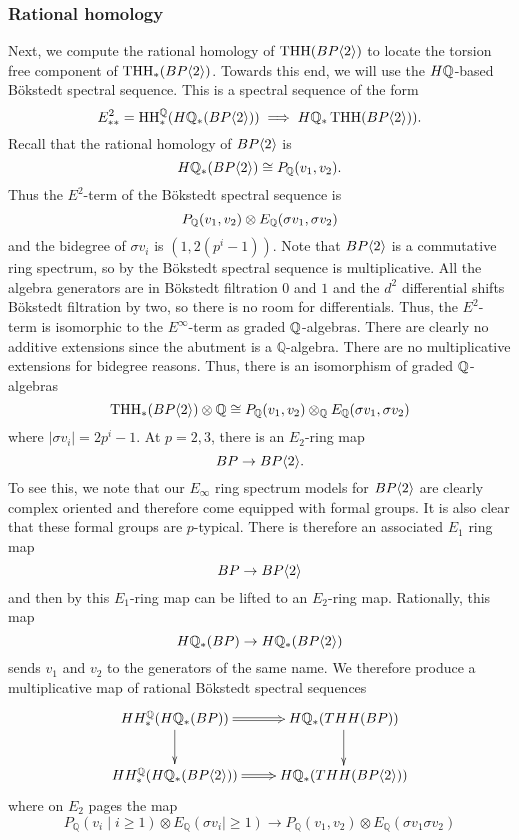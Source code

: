 \subsubsection{Rational homology}

Next, we compute the rational homology of $\operatorname{THH}(BP\langle 2 \rangle)$ to locate the torsion free component of $\operatorname{THH}_*(BP\langle 2 \rangle)$. Towards this end, we will use the $H\mathbb{Q}$-based B\"okstedt spectral sequence. This is a spectral sequence of the form 
\[
E^2_{**}=\operatorname{HH}_*^{\mathbb{Q}}(H\mathbb{Q}_*(BP\langle 2 \rangle))\implies H\mathbb{Q}_*\operatorname{THH}(BP\langle 2 \rangle)).
\]
Recall that the rational homology of $BP\langle 2 \rangle$ is  
\[
H\mathbb{Q}_*(BP\langle 2 \rangle)\cong P_{\mathbb{Q}} (v_1,v_2).
\]
Thus the $E^2$-term of the B\"okstedt spectral sequence is 
\[
P_{\mathbb{Q}}(v_1, v_2)\otimes E_{\mathbb{Q}}( \sigma v_1,\sigma v_2)
\]
and the bidegree of $\sigma v_i$ is $(1,2(p^i-1))$. Note that $BP\langle 2 \rangle$ is a commutative ring spectrum, so by \cite[Prop. 4.3]{AngeltveitRognes} the B\"okstedt spectral sequence is multiplicative. All the algebra generators are in B\"okstedt filtration $0$ and $1$ and the $d^2$ differential shifts B\"okstedt filtration by two, so there is no room for differentials. Thus, the $E^2$-term is isomorphic to the $E^\infty$-term as graded $\mathbb{Q}$-algebras. There are clearly no additive extensions since the abutment is a $\mathbb{Q}$-algebra. There are no multiplicative extensions for bidegree reasons. 
Thus, there is an isomorphism of graded $\mathbb{Q}$-algebras
\[
\operatorname{THH}_*(BP\langle 2 \rangle)\otimes \mathbb{Q}\cong P_{\mathbb{Q}}(v_1,v_2)\otimes_{\mathbb{Q}} E_{\mathbb{Q}}(\sigma v_1,\sigma v_2)
\]
where $|\sigma v_i|=2p^i-1$. At $p=2,3$, there is an $E_2$-ring map 
\[ BP\to BP\langle 2 \rangle.\]
To see this, we note that our $E_{\infty}$ ring spectrum models for $BP\langle 2 \rangle$ are clearly complex oriented and therefore come equipped with formal groups. It is also clear that these formal groups are $p$-typical. There is therefore an associated $E_1$ ring map
\[ BP\to BP\langle 2 \rangle\]
and then by \cite[Thm. 1.2]{CM15} this $E_1$-ring map can be lifted to an $E_2$-ring map. Rationally, this map 
\[ H\mathbb{Q}_*(BP)\to H\mathbb{Q}_*(BP\langle 2 \rangle)\]
sends $v_1$ and $v_2$ to the generators of the same name. 
We therefore produce a multiplicative map of rational B\"okstedt spectral sequences
\[ 
	\xymatrix{
		HH_*^{\mathbb{Q}}(H\mathbb{Q}_*(BP)) \ar[d] \ar@{=>}[r] &H\mathbb{Q}_*(THH(BP)) \ar[d] \\
		HH_*^{\mathbb{Q}}(H\mathbb{Q}_*(\B))\ar@{=>}[r] & H\mathbb{Q}_*(THH(\B))
	}
\]
where on $E_2$ pages the map 
\[ P_{\mathbb{Q}}(v_i \mid i \ge 1)\otimes E_{\mathbb{Q}}(\sigma v_i \mid \ge 1) \to P_{\mathbb{Q}}(v_1,v_2)\otimes E_{\mathbb{Q}}(\sigma v_1 \sigma v_2)\]
